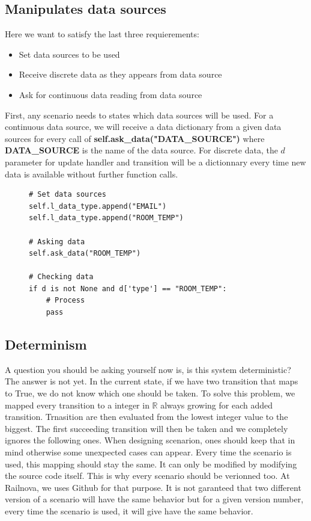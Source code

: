 \documentclass[12pt]{article}
\theoremstyle{definition}
\theoremstyle{definition}
\theoremstyle{remark}
\newcommand{\R}{\mathbb{R}}
\begin{document}
\subsection{Manipulates data sources}

Here we want to satisfy the last three requierements:
\begin{itemize}
\item Set data sources to be used
\item Receive discrete data as they appears from data source
\item Ask for continuous data reading from data source
\end{itemize}

First, any scenario needs to states which data sources will be used. For a continuous data source, we will receive a data dictionary from a given data sources for every call of \textbf{self.ask\_data("DATA\_SOURCE")} where \textbf{DATA\_SOURCE} is the name of the data source. For discrete data, the $d$ parameter for update handler and transition will be a dictionnary every time new data is available without further function calls.

\begin{figure}[H]
    \begin{lstlisting}[caption="Set data source",label={lst:python-data-sources}]
# Set data sources
self.l_data_type.append("EMAIL")
self.l_data_type.append("ROOM_TEMP")

# Asking data
self.ask_data("ROOM_TEMP")

# Checking data
if d is not None and d['type'] == "ROOM_TEMP":
    # Process
    pass
    \end{lstlisting}
\end{figure}


\subsection{Determinism}

A question you should be asking yourself now is, is this system deterministic? The answer is not yet. In the current state, if we have two transition that maps to True, we do not know which one should be taken. To solve this problem, we mapped every transition to a integer in $\R$ always growing for each added transition. Trnasition are then evaluated from the lowest integer value to the biggest. The first succeeding transition will then be taken and we completely ignores the following ones. When designing scenarion, ones should keep that in mind otherwise some unexpected cases can appear. Every time the scenario is used, this mapping should stay the same. It can only be modified by modifying the source code itself. This is why every scenario should be verionned too. At Railnova, we uses Github for that purpose. It is not garanteed that two different version of a scenario will have the same behavior but for a given version number, every time the scenario is used, it will give have the same behavior.
\end{document}
